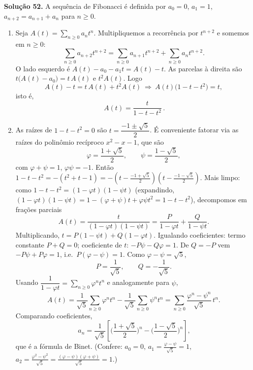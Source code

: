 \bigskip\noindent\textbf{Solução 52.}\quad
A sequência de Fibonacci é definida por $a_0=0$, $a_1=1$, $a_{n+2}=a_{n+1}+a_n$ para $n\ge0$.

\begin{enumerate}[label=(\alph*)]

\item Seja $A(t)=\sum_{n\ge0}a_n t^n$. Multipliquemos a recorrência por $t^{n+2}$ e somemos em $n\ge0$:
\[
\sum_{n\ge0}a_{n+2}t^{n+2}=\sum_{n\ge0}a_{n+1}t^{n+2}+\sum_{n\ge0}a_n t^{n+2}.
\]
O lado esquerdo é $A(t)-a_0-a_1t=A(t)-t$. As parcelas à direita são $t\big(A(t)-a_0\big)=t\,A(t)$ e $t^2A(t)$. Logo
\[
A(t)-t=t\,A(t)+t^2A(t)\ \Longrightarrow\ A(t)\big(1-t-t^2\big)=t,
\]
isto é,
\[
\boxed{\,A(t)=\frac{t}{1-t-t^2}\,}.
\]

\item As raízes de $1-t-t^2=0$ são $t=\dfrac{-1\pm\sqrt5}{2}$. É conveniente fatorar via as raízes do polinômio recíproco $x^2-x-1$, que são
\[
\varphi=\frac{1+\sqrt5}{2},\qquad \psi=\frac{1-\sqrt5}{2},
\]
com $\varphi+\psi=1$, $\varphi\psi=-1$. Então $1-t-t^2=-(t^2+t-1)=-(t-\frac{-1+\sqrt5}{2})(t-\frac{-1-\sqrt5}{2})$. Mais limpo: como $1-t-t^2=(1-\varphi t)(1-\psi t)$ (expandindo, $(1-\varphi t)(1-\psi t)=1-(\varphi+\psi)t+\varphi\psi t^2=1-t-t^2$), decompomos em frações parciais
\[
A(t)=\frac{t}{(1-\varphi t)(1-\psi t)}=\frac{P}{1-\varphi t}+\frac{Q}{1-\psi t}.
\]
Multiplicando, $t=P(1-\psi t)+Q(1-\varphi t)$. Igualando coeficientes: termo constante $P+Q=0$; coeficiente de $t$: $-P\psi-Q\varphi=1$. De $Q=-P$ vem $-P\psi+P\varphi=1$, i.e.\ $P(\varphi-\psi)=1$. Como $\varphi-\psi=\sqrt5$,
\[
P=\frac{1}{\sqrt5},\qquad Q=-\frac{1}{\sqrt5}.
\]
Usando $\dfrac{1}{1-\varphi t}=\sum_{n\ge0}\varphi^n t^n$ e analogamente para $\psi$,
\[
A(t)=\frac{1}{\sqrt5}\sum_{n\ge0}\varphi^n t^n-\frac{1}{\sqrt5}\sum_{n\ge0}\psi^n t^n
=\sum_{n\ge0}\frac{\varphi^n-\psi^n}{\sqrt5}\,t^n.
\]
Comparando coeficientes,
\[
\boxed{\,a_n=\frac{1}{\sqrt5}\!\left[\Big(\frac{1+\sqrt5}{2}\Big)^n-\Big(\frac{1-\sqrt5}{2}\Big)^n\right]},
\]
que é a fórmula de Binet. (Confere: $a_0=0$, $a_1=\frac{\varphi-\psi}{\sqrt5}=1$, $a_2=\frac{\varphi^2-\psi^2}{\sqrt5}=\frac{(\varphi-\psi)(\varphi+\psi)}{\sqrt5}=1$.)

\end{enumerate}


